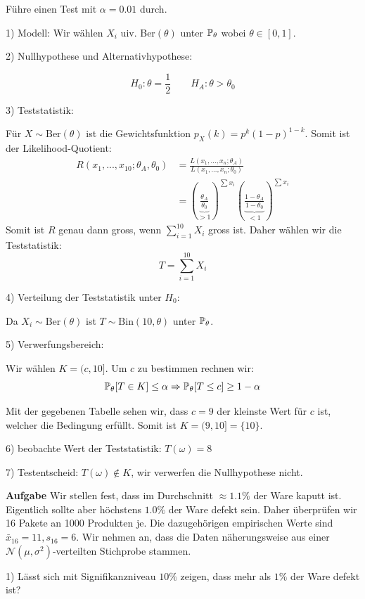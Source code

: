 Führe einen Test mit $\alpha = 0.01$ durch. \smallskip

1) Modell: \quad Wir wählen $X_i$ uiv. Ber$(\theta)$ unter $\mathbb{P}_\theta$ wobei $\theta \in [0,1]$. \smallskip

2) Nullhypothese und Alternativhypothese:

$$H_0: \theta = \frac{1}{2} \qquad H_A: \theta > \theta_0$$

3) Teststatistik:

Für $X \sim \text{Ber}(\theta)$ ist die Gewichtsfunktion $p_X(k) = p^k(1-p)^{1-k}$. Somit ist der Likelihood-Quotient:
\begin{align*}
	R(x_1,...,x_10; \theta_A, \theta_0) &= \frac{L(x_1,...,x_n; \theta_A)}{L(x_1,...,x_n; \theta_0)} \\
	&= \left( \underbrace{\frac{\theta_A}{\theta_0}}_{> 1} \right)^{\sum x_i} \left( \underbrace{\frac{1 - \theta_A}{1 - \theta_0}}_{< 1} \right)^{\sum x_i}
\end{align*}
 Somit ist $R$ genau dann gross, wenn $\sum_{i=1}^{10} X_i$ gross ist. Daher wählen wir die Teststatistik:
 $$T = \sum_{i=1}^{10}X_i$$

4) Verteilung der Teststatistik unter $H_0$:

Da $X_i \sim \text{Ber}(\theta)$ ist $T \sim \text{Bin}(10, \theta)$ unter $\mathbb{P}_\theta$. \smallskip

5) Verwerfungsbereich:

Wir wählen $K = (c, 10]$. Um $c$ zu bestimmen rechnen wir:
$$\mathbb{P}_\theta[T \in K] \leq \alpha \Rightarrow \mathbb{P}_\theta[T \leq c] \geq 1- \alpha$$

Mit der gegebenen Tabelle sehen wir, dass $c = 9$ der kleinste Wert für $c$ ist, welcher die Bedingung erfüllt. Somit ist $K = (9,10] = \{10\}$. \smallskip

6) beobachte Wert der Teststatistik: \quad $T(\omega) = 8$ \smallskip

7) Testentscheid: \quad $T(\omega) \notin K$, wir verwerfen die Nullhypothese nicht.

\hrulefill

\textbf{Aufgabe}
Wir stellen fest, dass im Durchschnitt $\approx 1.1 \%$ der Ware kaputt ist. Eigentlich sollte aber höchstens $1.0 \%$ der Ware defekt sein. Daher überprüfen wir 16 Pakete an 1000 Produkten je. Die dazugehörigen empirischen Werte sind $\bar x_{16} = 11, s_{16} = 6$. Wir nehmen an, dass die Daten näherungsweise aus einer $\mathcal{N}(\mu, \sigma^2)$-verteilten Stichprobe stammen. \smallskip

1) Lässt sich mit Signifikanzniveau $10 \%$ zeigen, dass mehr als $1 \%$ der Ware defekt ist? \smallskip

